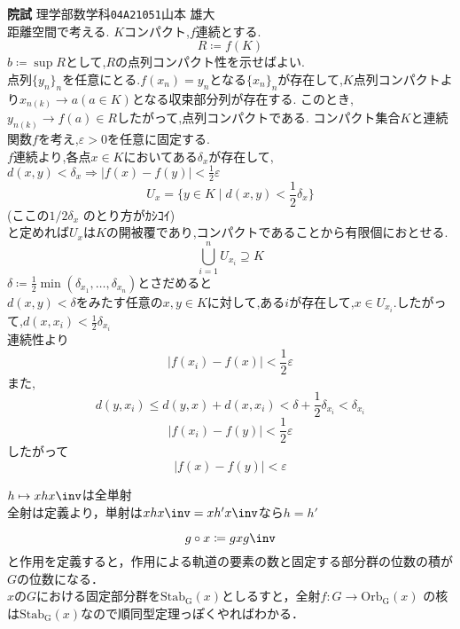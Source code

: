\documentclass[leqno]{ltjsarticle}%
\begin{document}
{\textbf{\Large{院試}}}\hspace{\fill} {理学部数学科\texttt{\Large{04A21051}}}{\Large{山本 雄大}}\\
距離空間で考える.
$K$コンパクト,$f$連続とする.
\[R \coloneq f(K)\]
$b\coloneq \sup R$として,$R$の点列コンパクト性を示せばよい. \\
点列$\{y_n\}_n$を任意にとる.$f(x_n)=y_n$となる$\{x_n\}_n$が存在して,$K$点列コンパクトより$x_{n(k)}\to a (a\in K)$となる収束部分列が存在する.
このとき,$y_{n(k)}\to f(a) \in R$したがって,点列コンパクトである.
コンパクト集合$K$と連続関数$f$を考え,$\varepsilon > 0$を任意に固定する.\\
$f$連続より,各点$x\in K$においてある$\delta_{x}$が存在して,$d(x,y) < \delta_{x} \Longrightarrow |f(x) - f(y) | < \frac12\varepsilon $\\
\[U_x = \{y \in K \mid d(x,y) < \frac12 \delta_x\}\] 
(ここの$1/2 \delta_x$ のとり方がｶｼｺｲ)\\
と定めれば$U_x$は$K$の開被覆であり,コンパクトであることから有限個におとせる.
\[\bigcup_{i=1}^n U_{x_i} \supseteq K\]
$\delta \coloneq \frac12 \min(\delta_{x_1},\ldots , \delta_{x_n})$とさだめると\\
$d(x,y)< \delta$をみたす任意の$x,y \in K $に対して,ある$i$が存在して,$x\in U_{x_i}$.したがって,$d(x,x_i) < \frac12 \delta_{x_i}$\\
連続性より
\[|f(x_i) - f(x) |< \frac12 \varepsilon\]
また,
\[d(y,x_i) \leq d(y,x) + d(x,x_i) < \delta + \frac12 \delta_{x_i} < \delta_{x_i}\]
\[|f(x_i) - f(y)| < \frac12 \varepsilon\]
したがって
\[|f(x) - f(y)|<\varepsilon \]

$h\mapsto xhx\inv$は全単射\\
全射は定義より，単射は$xhx\inv  = xh'x\inv$なら$h=h'$





\[g\circ x \coloneq gxg\inv\]
と作用を定義すると，作用による軌道の要素の数と固定する部分群の位数の積が$G$の位数になる．\\
$x$の$G$における固定部分群を$\mathrm{Stab_G}(x)$としるすと，全射$f\colon G \to \mathrm{Orb_G}(x)$
の核は$\mathrm{Stab_G}(x)$なので順同型定理っぽくやればわかる．
\end{document}

